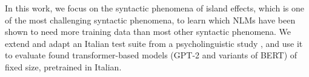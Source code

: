 In this work, we focus on the syntactic phenomena of island effects, which is one of the most challenging syntactic phenomena, to learn which NLMs have been shown to need more training data than most other syntactic phenomena. We extend and adapt an Italian test suite from a psycholinguistic study \citep{sprouse2016experimental}, and use it to evaluate found transformer-based models (GPT-2 and variants of BERT) of fixed size, pretrained in Italian. %

